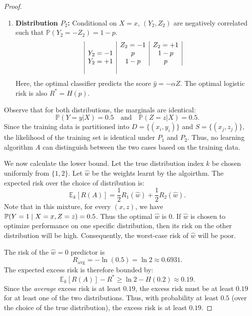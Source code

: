 \begin{proof}
\begin{enumerate}
        \item[(II)] \textbf{Distribution $P_2$:} Conditional on $X=x$, $(Y_2, Z_2)$ are negatively correlated such that $\mathbb{P}(Y_2 = -Z_2) = 1-p$.
        \begin{equation*}
            \begin{array}{|c|c|c|}
                \hline
                & Z_2=-1 & Z_2=+1 \\
                \hline
                Y_2=-1 & p & 1-p \\
                \hline
                Y_2=+1 & 1-p & p \\
                \hline
            \end{array}
        \end{equation*}
        Here, the optimal classifier predicts the score $\hat{y} = -\alpha Z$. The optimal logistic risk is also $R^* = H(p)$.
    \end{enumerate}
    Observe that for both distributions, the marginals are identical:
    \begin{equation*}
        \mathbb{P}(Y=y|X) = 0.5 \quad \text{and} \quad \mathbb{P}(Z=z|X) = 0.5.
    \end{equation*}
    Since the training data is partitioned into $D=\{(x_i, y_i)\}$ and $S=\{(x_j, z_j)\}$, the likelihood of the training set is identical under $P_1$ and $P_2$. Thus, no learning algorithm $A$ can distinguish between the two cases based on the training data.

    \noindent We now calculate the lower bound. Let the true distribution index $k$ be chosen uniformly from $\{1, 2\}$. Let $\hat{w}$ be the weights learnt by the algoirthm. The expected risk over the choice of distribution is:
    \begin{equation*}
        \mathbb{E}_k[R(A)] = \frac{1}{2} R_1(\hat{w}) + \frac{1}{2} R_2(\hat{w}).
    \end{equation*}
Note that in this mixture, for every $(x,z)$, we have $\prob(Y=1 \mid X=x, Z=z) = 0.5$. Thus the optimal $\hat{w}$ is $0$. If $\hat{w}$ is chosen to optimize performance on one specific distribution, then its risk on the other distribution will be high. Consequently, the worst-case risk of $\hat{w}$ will be poor.

The risk of the $\hat{w} = 0$ predictor is
    \begin{equation*}
        R_{\text{avg}} = -\ln(0.5) = \ln 2 \approx 0.6931.
    \end{equation*}
    The expected excess risk is therefore bounded by:
    \begin{equation*}
        \mathbb{E}_k[R(A)] - R^* \geq \ln 2 - H(0.2) \approx 0.19.
    \end{equation*}
    Since the \textit{average} excess risk is at least $0.19$, the excess risk must be at least $0.19$ for at least one of the two distributions. Thus, with probability at least $0.5$ (over the choice of the true distribution), the excess risk is at least $0.19$.
\end{proof}